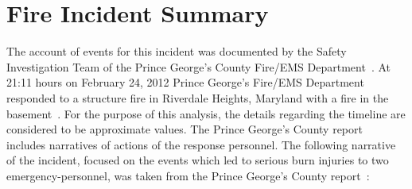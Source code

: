 \documentclass[12pt,oneside]{book}
\begin{document}
\chapter{Fire Incident Summary}
\label{fire_sum}
The account of events for this incident was documented by the Safety Investigation Team of the Prince George's County Fire/EMS Department~\cite{PGCounty2013}. At 21:11 hours on February 24, 2012 Prince George's Fire/EMS Department responded to a structure fire in Riverdale Heights, Maryland with a fire in the basement~\cite{PGCounty2013}. For the purpose of this analysis, the details regarding the timeline are considered to be approximate values. The Prince George's County report~\cite{PGCounty2013} includes narratives of actions of the response personnel. The following narrative of the incident, focused on the events which led to serious burn injuries to two emergency-personnel, was taken from the Prince George's County report~\cite{PGCounty2013}:
\end{document}
